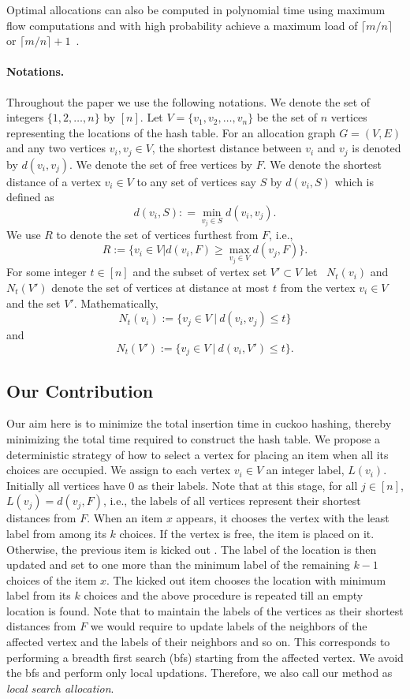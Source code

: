 \noindent Optimal allocations can also
be computed in polynomial time using maximum 
flow computations and with high probability achieve a maximum load of 
$\lceil m/n\rceil$ or $\lceil m/n\rceil +1$~\cite{sek99}. 

\paragraph{Notations.} Throughout the paper we use the following notations. We denote the set of integers $\{1,2,\ldots, n\}$ by $[n]$. Let $V=\{v_1,v_2,\ldots, v_n\}$ be the set of $n$ vertices representing the locations of the hash table. For an allocation graph $G=(V,E)$ and any two vertices $v_i,v_j\in V$, the shortest distance between $v_i$ and $v_j$ is denoted by $d(v_i,v_j).$  We denote the set of free vertices by $F$. We denote the shortest distance of a vertex $v_i\in V$ to any set of vertices say $S$ by $d(v_i,S)$ which is defined as \[d(v_i,S): = \min_{v_j\in S} d(v_i,v_j).\] We use $R$ to denote the set of vertices furthest from $F$, i.e.,
\[   R:= \{ v_i\in V |d(v_i, F ) \ge \max_{ v_j \in V} d(v_j,F)\}.
\]
For some integer $t\in[n]$ and the subset of vertex set $V' \subset V$ let ~$N_{t}(v_i)$ and $N_{t}(V')$ denote the set of vertices at distance at most $t$ from the vertex $v_i \in V$ and the set $V'$. Mathematically,
\[ N_{t}(v_i) := \{ v_j \in V~| ~d(v_i,v_j) \le t  \} \]
and 
\[ N_{t}(V') := \{ v_j \in V~| ~d(v_i,V') \le t  \} .\]
\subsection{Our Contribution}
Our aim here is to minimize the total insertion time in cuckoo hashing, thereby minimizing the total time required to construct the hash table.   We propose a deterministic strategy of how to select a vertex for placing an item when all its choices are occupied.
We assign to each vertex $v_i\in V$ an integer label, $L(v_i)$. Initially all vertices have $0$ as their labels. Note that at this stage, for all  $j\in [n]$, $L(v_j) =d(v_j,F)$, i.e., the labels of all vertices represent their shortest distances from $F$. When an item $x$ appears, it chooses the vertex with the least label from among its $k$ choices. If the vertex is free, the item is placed on it. Otherwise, the previous item is kicked out . The label of the location is then updated and set to one more than the minimum label of the remaining $k-1$ choices of the item $x$. The kicked out item chooses the location with minimum label from its $k$ choices and the above procedure is repeated till an empty location is found. 
Note that to maintain the labels of the vertices as their shortest distances from $F$ we would require to update labels of the neighbors of the affected vertex and the labels of their neighbors and so on. This corresponds to performing a breadth first search (bfs) starting from the affected vertex. We avoid the bfs and perform only local updations. Therefore, we also call our method as \emph{local search allocation}. 

